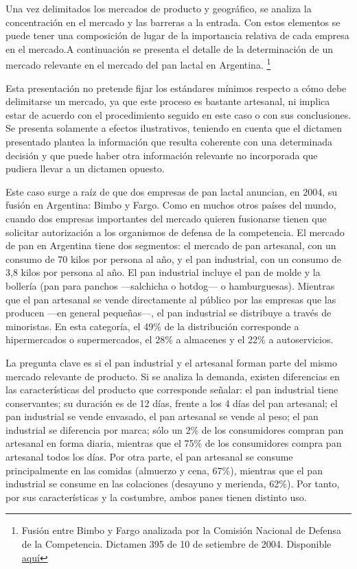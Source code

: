 \documentclass[
  12pt,
  spanish,
]{book}
\begin{document}
Una vez delimitados los mercados de producto y geográfico, se analiza la concentración en el mercado y las barreras a la entrada. Con estos elementos se puede tener una composición de lugar de la importancia relativa de cada empresa en el mercado.A continuación se presenta el detalle de la determinación de un mercado relevante en el mercado del pan lactal en Argentina.
\footnote{Fusión entre Bimbo y Fargo analizada por la Comisión Nacional de Defensa de la Competencia. Dictamen 395 de 10 de setiembre de 2004. Disponible \href{http://cndc.produccion.gob.ar/sites/default/files/cndcfiles/395_0.pdf}{aquí}}

Esta presentación no pretende fijar los estándares mínimos respecto a cómo debe delimitarse un mercado, ya que este proceso es bastante artesanal, ni implica estar de acuerdo con el procedimiento seguido en este caso o con sus conclusiones. Se presenta solamente a efectos ilustrativos, teniendo en cuenta que el dictamen presentado plantea la información que resulta coherente con una determinada decisión y que puede haber otra información relevante no incorporada que pudiera llevar a un dictamen opuesto.

Este caso surge a raíz de que dos empresas de pan lactal anuncian, en 2004, su fusión en Argentina: Bimbo y Fargo. Como en muchos otros países del mundo, cuando dos empresas importantes del mercado quieren fusionarse tienen que solicitar autorización a los organismos de defensa de la competencia. El mercado de pan en Argentina tiene dos segmentos: el mercado de pan artesanal, con un consumo de 70 kilos por persona al año, y el pan industrial, con un consumo de 3,8 kilos por persona al año. El pan industrial incluye el pan de molde y la bollería (pan para panchos ---salchicha o hotdog--- o hamburguesas). Mientras que el pan artesanal se vende directamente al público por las empresas que las producen ---en general pequeñas---, el pan industrial se distribuye a través de minoristas. En esta categoría, el 49\% de la distribución corresponde a hipermercados o supermercados, el 28\% a almacenes y el 22\% a autoservicios.

La pregunta clave es si el pan industrial y el artesanal forman parte del mismo mercado relevante de producto.
Si se analiza la demanda, existen diferencias en las características del producto que corresponde señalar: el pan industrial tiene conservantes; su duración es de 12 días, frente a los 4 días del pan artesanal; el pan industrial se vende envasado, el pan artesanal se vende al peso; el pan industrial se diferencia por marca; sólo un 2\% de los consumidores compran pan artesanal en forma diaria, mientras que el 75\% de los consumidores compra pan artesanal todos los días. Por otra parte, el pan artesanal se consume principalmente en las comidas (almuerzo y cena, 67\%), mientras que el pan industrial se consume en las colaciones (desayuno y merienda, 62\%). Por tanto, por sus características y la costumbre, ambos panes tienen distinto uso.
\end{document}
